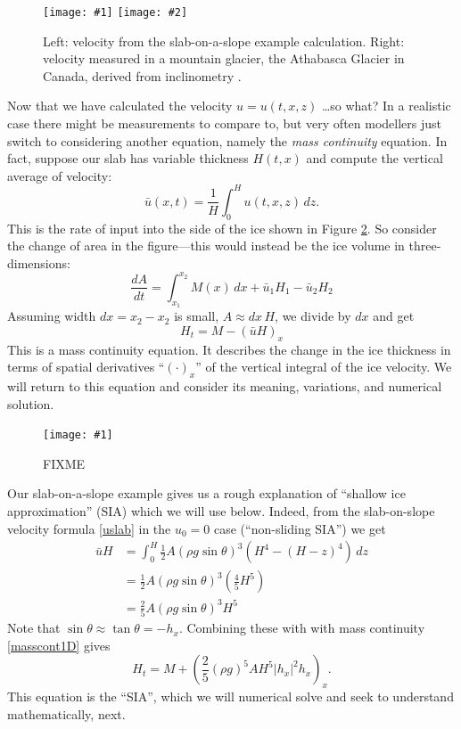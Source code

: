 \documentclass[titlepage,letterpaper,final,12pt]{scrartcl}
\newcommand{\onefig}[2]{
\begin{figure}[ht]
\centering
\texttt{[image: \#1]}
\caption{#2}
\label{fig:#1}
\end{figure}}
\newcommand{\twofig}[3]{
\begin{figure}[ht]
\centering
\texttt{[image: \#1]} \quad
\texttt{[image: \#2]}
\caption{#3}
\label{fig:#1}
\end{figure}}
\begin{document}
\twofig{slabvel}{athabasca_deform}{Left: velocity from the slab-on-a-slope example calculation.  Right: velocity measured in a mountain glacier, the Athabasca Glacier in Canada, derived from inclinometry \cite{SavagePaterson}.}

Now that we have calculated the velocity $u=u(t,x,z)$ \dots so what?  In a realistic case there might be measurements to compare to, but very often modellers just switch to considering another equation, namely the \emph{mass continuity} equation.  In fact, suppose our slab has variable thickness $H(t,x)$ and compute the vertical average of velocity:
	$$\bar u(x,t) = \frac{1}{H}\int_0^{H} u(t,x,z)\,dz.$$
This is the rate of input into the side of the ice shown in Figure \ref{fig:slabmasscontfig}.  So consider the change of area in the figure---this would instead be the ice volume in three-dimensions:
	$$\frac{dA}{dt} = \int_{x_1}^{x_2} M(x)\,dx + \bar u_1 H_1 - \bar u_2 H_2$$
Assuming width $dx=x_2-x_2$ is small, $A\approx dx\, H$, we divide by $dx$ and get
\begin{equation}
H_t = M - \left(\bar u H\right)_x \label{masscont1D}
\end{equation}
This is a mass continuity equation.  It describes the change in the ice thickness in terms of spatial derivatives ``$(\cdot)_x$'' of the vertical integral of the ice velocity.  We will return to this equation and consider its meaning, variations, and numerical solution.

\onefig{slabmasscontfig}{FIXME}

Our slab-on-a-slope example gives us a rough explanation of ``shallow ice approximation'' (SIA) which we will use below.  Indeed, from the slab-on-slope velocity formula \eqref{uslab} in the $u_0=0$ case (``non-sliding SIA'') we get
\begin{align*}
\bar u H &= \int_0^H \frac{1}{2} A (\rho g \sin\theta)^3  \left(H^4 - (H-z)^4\right)\,dz \\
	&= \frac{1}{2} A (\rho g \sin\theta)^3  \left(\frac{4}{5} H^5\right) \\
	&= \frac{2}{5} A (\rho g \sin\theta)^3 H^5
\end{align*}
Note that $\sin \theta \approx \tan\theta = - h_x$.  Combining these with with mass continuity \eqref{masscont1D} gives
  $$H_t = M + \left(\frac{2}{5} (\rho g)^5 A H^5 |h_x|^2 h_x\right)_x.$$
This equation is the ``SIA'', which we will numerical solve and seek to understand mathematically, next.
\end{document}

